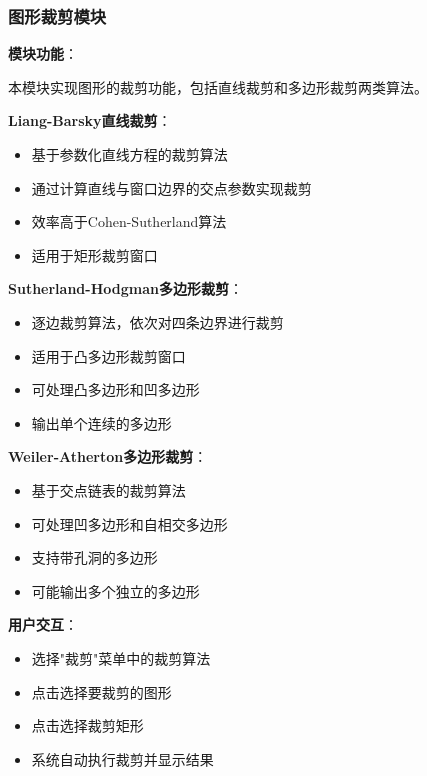 \documentclass[12pt,a4paper]{article}
\begin{document}
\begin{tcolorbox}	\subsubsection{图形裁剪模块}
\textbf{模块功能}：

本模块实现图形的裁剪功能，包括直线裁剪和多边形裁剪两类算法。

\textbf{Liang-Barsky直线裁剪}：
\begin{itemize}
    \item 基于参数化直线方程的裁剪算法
    \item 通过计算直线与窗口边界的交点参数实现裁剪
    \item 效率高于Cohen-Sutherland算法
    \item 适用于矩形裁剪窗口
\end{itemize}

\textbf{Sutherland-Hodgman多边形裁剪}：
\begin{itemize}
    \item 逐边裁剪算法，依次对四条边界进行裁剪
    \item 适用于凸多边形裁剪窗口
    \item 可处理凸多边形和凹多边形
    \item 输出单个连续的多边形
\end{itemize}

\textbf{Weiler-Atherton多边形裁剪}：
\begin{itemize}
    \item 基于交点链表的裁剪算法
    \item 可处理凹多边形和自相交多边形
    \item 支持带孔洞的多边形
    \item 可能输出多个独立的多边形
\end{itemize}

\textbf{用户交互}：
\begin{itemize}
    \item 选择"裁剪"菜单中的裁剪算法
    \item 点击选择要裁剪的图形
    \item 点击选择裁剪矩形
    \item 系统自动执行裁剪并显示结果
\end{itemize}
\end{tcolorbox}

\clearpage
\end{document}
